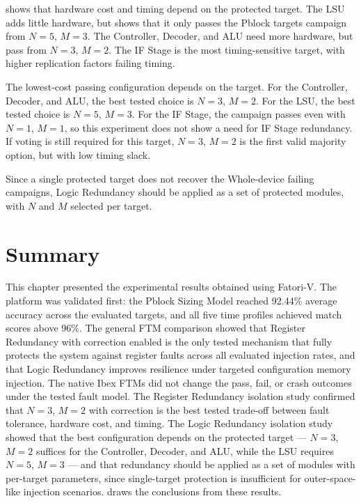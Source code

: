  shows that hardware cost and timing depend on the protected target. The \ac{LSU} adds little hardware, but  shows that it only passes the Pblock targets campaign from \(N=5\), \(M=3\). The Controller, Decoder, and \ac{ALU} need more hardware, but pass from \(N=3\), \(M=2\). The IF Stage is the most timing-sensitive target, with higher replication factors failing timing.

The lowest-cost passing configuration depends on the target. For the Controller, Decoder, and \ac{ALU}, the best tested choice is \(N=3\), \(M=2\). For the \ac{LSU}, the best tested choice is \(N=5\), \(M=3\). For the IF Stage, the campaign passes even with \(N=1\), \(M=1\), so this experiment does not show a need for IF Stage redundancy. If voting is still required for this target, \(N=3\), \(M=2\) is the first valid majority option, but with low timing slack. 

Since a single protected target does not recover the Whole-device failing campaigns, Logic Redundancy should be applied as a set of protected modules, with \(N\) and \(M\) selected per target.



\section{Summary}
\label{chap9:summary}

This chapter presented the experimental results obtained using \ac{Fatori-V}. The platform was validated first: the Pblock Sizing Model reached 92.44\% average accuracy across the evaluated targets, and all five time profiles achieved match scores above 96\%. The general \ac{FTM} comparison showed that Register Redundancy with correction enabled is the only tested mechanism that fully protects the system against register faults across all evaluated injection rates, and that Logic Redundancy improves resilience under targeted configuration memory injection. The native Ibex \acp{FTM} did not change the pass, fail, or crash outcomes under the tested fault model. The Register Redundancy isolation study confirmed that \(N=3\), \(M=2\) with correction is the best tested trade-off between fault tolerance, hardware cost, and timing. The Logic Redundancy isolation study showed that the best configuration depends on the protected target — \(N=3\), \(M=2\) suffices for the Controller, Decoder, and \ac{ALU}, while the \ac{LSU} requires \(N=5\), \(M=3\) — and that redundancy should be applied as a set of modules with per-target parameters, since single-target protection is insufficient for outer-space-like injection scenarios.  draws the conclusions from these results.
